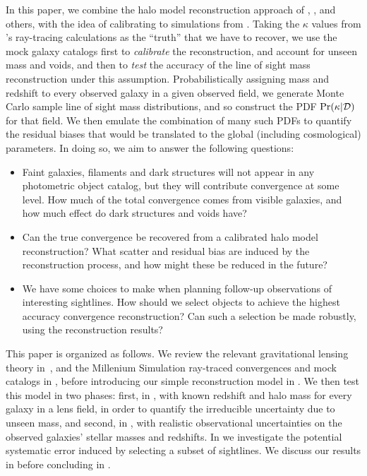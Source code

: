\documentclass[useAMS,usenatbib]{mn2e}
\begin{document}
In this paper, we combine the halo model reconstruction approach of
\citeauthor{GunnarssonEtal2006}, \citeauthor{JonssonEtal2010}, 
\citeauthor{WongEtal2011} and others, with the
idea of calibrating to simulations from \citeauthor{SuyuEtal2010}.
Taking the $\kappa$ values from
\citeauthor{HilbertEtal2009}'s ray-tracing calculations as the ``truth''
that we have to recover, we use the \MS mock galaxy catalogs first to
{\it calibrate} the reconstruction, and account for unseen mass and
voids, and then to {\it test} the accuracy of the line of sight mass
reconstruction under this assumption. Probabilistically assigning mass
and redshift to every observed galaxy in a given observed field, we
generate Monte Carlo sample line of sight mass distributions, and so
construct the PDF $\Pr(\kappa|{\mathcal{D}})$ for that field. We then emulate
the combination of many such PDFs to quantify the residual biases that
would be translated to the global (including cosmological) parameters.
In doing so, we aim to answer the following questions: 

\begin{itemize}

\item Faint galaxies, filaments and dark structures will not appear in
any photometric object catalog, but they will contribute convergence at
some level. How much of the total convergence comes from visible
galaxies, and how much effect do dark structures and voids have? 

\item Can the true convergence be recovered from a calibrated halo model
reconstruction? What scatter and residual bias are induced by the
reconstruction process, and how might these be reduced in the future? 

\item We have some choices to make when planning follow-up observations
of interesting sightlines. How should we select objects to achieve the
highest accuracy convergence reconstruction? Can such a selection be
made robustly, using the reconstruction results?

\end{itemize}


This paper is organized as follows. We review the relevant gravitational
lensing theory in~, and the Millenium Simulation
ray-traced convergences and mock catalogs in , before
introducing our simple reconstruction  model in . We
then test this model in two phases: first, in , with
known redshift and halo mass for every galaxy in a lens field, in order
to quantify the irreducible uncertainty due to unseen mass, and second,
in , with realistic observational uncertainties on
the observed galaxies' stellar masses and redshifts. In
 we investigate the potential systematic error induced
by selecting a subset of sightlines. We discuss our results in
 before concluding in .
\end{document}

